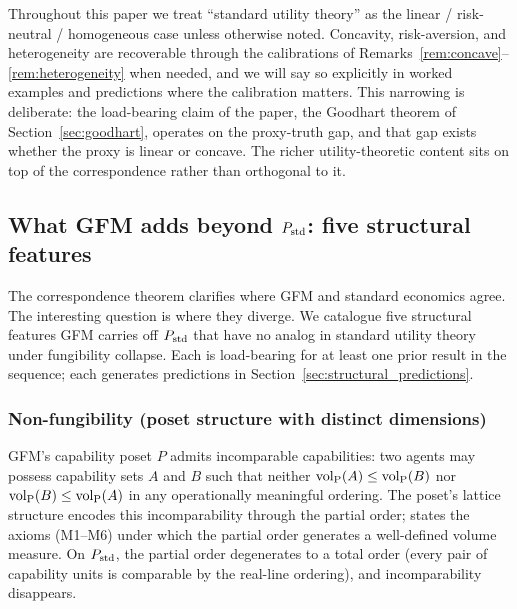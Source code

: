 \begin{remark}
\label{rem:utility_scope}
Throughout this paper we treat ``standard utility theory'' as the
linear / risk-neutral / homogeneous case unless otherwise noted.
Concavity, risk-aversion, and heterogeneity are recoverable through
the calibrations of Remarks~\ref{rem:concave}--\ref{rem:heterogeneity}
when needed, and we will say so explicitly in worked examples and
predictions where the calibration matters.  This narrowing is
deliberate: the load-bearing claim of the paper, the Goodhart
theorem of Section~\ref{sec:goodhart}, operates on the proxy-truth
gap, and that gap exists whether the proxy is linear or concave.
The richer utility-theoretic content sits on top of the
correspondence rather than orthogonal to it.
\end{remark}

\subsection{What GFM adds beyond $P_{\mathrm{std}}$: five structural features}
\label{sec:fc_features}

The correspondence theorem clarifies where GFM and standard
economics agree.  The interesting question is where they diverge.
We catalogue five structural features GFM carries off $P_{\mathrm{std}}$ that
have no analog in standard utility theory under fungibility
collapse.  Each is load-bearing for at least one prior result in the
sequence; each generates predictions in
Section~\ref{sec:structural_predictions}.

\subsubsection{Non-fungibility (poset structure with distinct dimensions)}

GFM's capability poset $P$ admits incomparable capabilities: two
agents may possess capability sets $A$ and $B$ such that neither
${\operatorname{vol}_{\mathrm{P}}}(A) \leq {\operatorname{vol}_{\mathrm{P}}}(B)$ nor ${\operatorname{vol}_{\mathrm{P}}}(B) \leq {\operatorname{vol}_{\mathrm{P}}}(A)$ in any
operationally meaningful ordering.  The poset's lattice structure
encodes this incomparability through the partial order;
\citep[Proposition~1]{lasser2026poset} states the axioms (M1--M6)
under which the partial order generates a well-defined volume
measure.  On $P_{\mathrm{std}}$, the partial order degenerates to a total
order (every pair of capability units is comparable by the
real-line ordering), and incomparability disappears.


